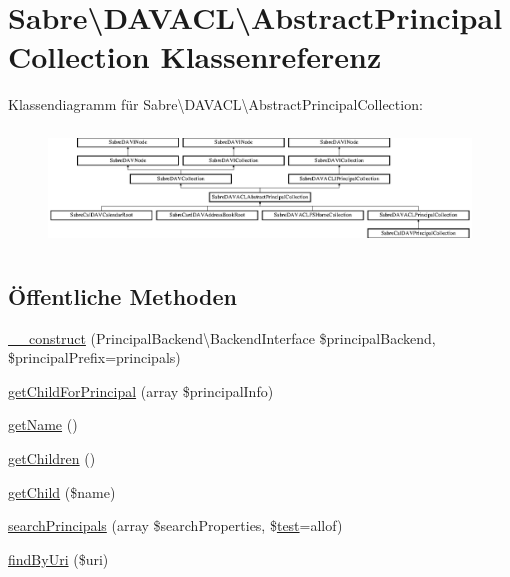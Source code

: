 \hypertarget{class_sabre_1_1_d_a_v_a_c_l_1_1_abstract_principal_collection}{}\section{Sabre\textbackslash{}D\+A\+V\+A\+CL\textbackslash{}Abstract\+Principal\+Collection Klassenreferenz}
\label{class_sabre_1_1_d_a_v_a_c_l_1_1_abstract_principal_collection}
Klassendiagramm für Sabre\textbackslash{}D\+A\+V\+A\+CL\textbackslash{}Abstract\+Principal\+Collection\+:\begin{figure}[H]
\begin{center}
\leavevmode
\includegraphics[height=3.146067cm]{class_sabre_1_1_d_a_v_a_c_l_1_1_abstract_principal_collection}
\end{center}
\end{figure}
\subsection*{Öffentliche Methoden}
\begin{DoxyCompactItemize}
\item 
\mbox{\hyperlink{class_sabre_1_1_d_a_v_a_c_l_1_1_abstract_principal_collection_ac4f5df2f795559a2ee3a1cf54e33f872}{\+\_\+\+\_\+construct}} (Principal\+Backend\textbackslash{}\+Backend\+Interface \$principal\+Backend, \$principal\+Prefix=\textquotesingle{}principals\textquotesingle{})
\item 
\mbox{\hyperlink{class_sabre_1_1_d_a_v_a_c_l_1_1_abstract_principal_collection_a46ead24bab32ac9de85b0e0493cef4a9}{get\+Child\+For\+Principal}} (array \$principal\+Info)
\item 
\mbox{\hyperlink{class_sabre_1_1_d_a_v_a_c_l_1_1_abstract_principal_collection_aa6aad4134ae5461bb47df0afd6547c9e}{get\+Name}} ()
\item 
\mbox{\hyperlink{class_sabre_1_1_d_a_v_a_c_l_1_1_abstract_principal_collection_abf3123b838a191b0a60d2324ba3e95dc}{get\+Children}} ()
\item 
\mbox{\hyperlink{class_sabre_1_1_d_a_v_a_c_l_1_1_abstract_principal_collection_a98e600c953e0ffa2b0736bac07fd51c1}{get\+Child}} (\$name)
\item 
\mbox{\hyperlink{class_sabre_1_1_d_a_v_a_c_l_1_1_abstract_principal_collection_acb5760aa6f3fd56f345b28df38e87249}{search\+Principals}} (array \$search\+Properties, \$\mbox{\hyperlink{classtest}{test}}=\textquotesingle{}allof\textquotesingle{})
\item 
\mbox{\hyperlink{class_sabre_1_1_d_a_v_a_c_l_1_1_abstract_principal_collection_aea345cf559cc83b45134fea498854293}{find\+By\+Uri}} (\$uri)
\end{DoxyCompactItemize}

